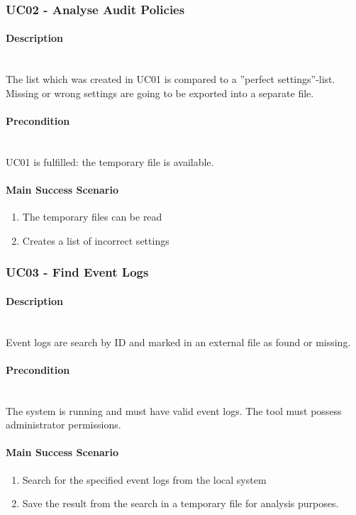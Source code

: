 \subsubsection{UC02 - Analyse Audit Policies}\label{UC02}
\begin{tcolorbox}
    \paragraph{Description} \ \\
    The list which was created in UC01 is compared to a ''perfect settings''-list. Missing or wrong settings are going to be exported into a separate file.
    \ \\
    \paragraph{Precondition} \ \\
    UC01 is fulfilled: the temporary file is available.
    \ \\
    \paragraph{Main Success Scenario} 
    \begin{enumerate}
        \item The temporary files can be read
        \item Creates a list of incorrect settings
    \end{enumerate}   
\end{tcolorbox}
\subsubsection{UC03 - Find Event Logs}\label{UC03}
\begin{tcolorbox}
    \paragraph{Description} \ \\
    Event logs are search by ID and marked in an external file as found or missing.
    \ \\
    \paragraph{Precondition} \ \\
    The system is running and must have valid event logs. The tool must possess administrator permissions.
    \ \\
    \paragraph{Main Success Scenario} 
    \begin{enumerate}
        \item Search for the specified event logs from the local system
        \item Save the result from the search in a temporary file for analysis purposes.
    \end{enumerate}
\end{tcolorbox}


